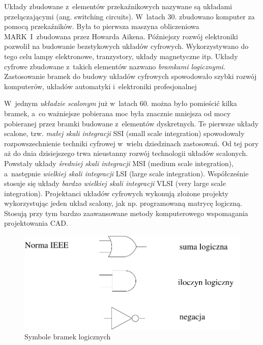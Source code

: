 \documentclass[a4paper,11pt]{article}
\begin{document}
Układy zbudowane z~elementów przekaźnikowych nazywane są układami przełączającymi (ang. switching circuits).  W~latach 30. zbudowano komputer za pomocą przekaźników. Była to pierwsza maszyna obliczeniowa MARK~I~zbudowana przez Howarda Aikena. Późniejszy rozwój elektroniki pozwolił na budowanie bezstykowych układów cyfrowych. Wykorzystywano do tego celu lampy elektronowe, tranzystory, układy magnetyczne itp. Układy cyfrowe zbudowane z~takich elementów nazwano \emph{bramkami logicznymi}. Zastosowanie bramek do budowy układów cyfrowych spowodowało szybki rozwój komputerów, układów automatyki i~elektroniki profesjonalnej

W~jednym \emph{układzie scalonym} już w~latach 60. można było pomieścić kilka bramek, a~co ważniejsze pobierana moc była znacznie mniejsza od mocy pobieranej przez bramki budowane z~elementów dyskretnych. Te pierwsze układy scalone, tzw. \emph{małej skali integracji} SSI (small scale integration) spowodowały rozpowszechnienie techniki cyfrowej w~wielu dziedzinach zastosowań. Od tej pory aż do dnia dzisiejszego trwa nieustanny rozwój technologii układów scalonych. Powstały układy \emph{średniej skali integracji} MSI (medium scale integration), a~następnie \emph{wielkiej skali integracji} LSI (large scale integration). Współcześnie stosuje się układy \emph{bardzo wielkiej skali integracji} VLSI (very large scale integration). Projektanci układów cyfrowych wykonują złożone projekty wykorzystując jeden układ scalony, jak np. programowaną matrycę logiczną. Stosują przy tym bardzo zaawansowane metody komputerowego wspomagania projektowania CAD.

\begin{figure}[!htb]
\centerline{\includegraphics[scale=0.6]{symbole-bramek.pdf}}
\caption{Symbole bramek logicznych}
\label{fig:symboleBramekLogicznych}
\end{figure}
\end{document}
